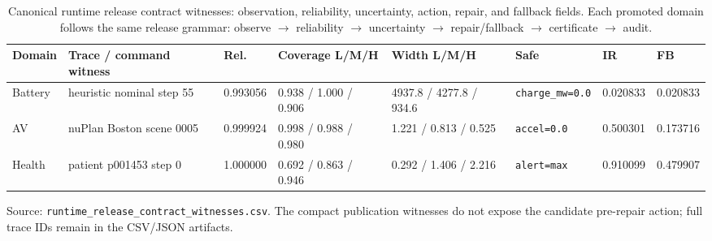 \begin{table}[t]
\centering
\caption{Canonical runtime release contract witnesses: observation, reliability,
uncertainty, action, repair, and fallback fields.  Each promoted domain follows
the same release grammar: observe $\rightarrow$ reliability $\rightarrow$ uncertainty
$\rightarrow$ repair/fallback $\rightarrow$ certificate $\rightarrow$ audit.}
\label{tab:runtime-release-contract-witnesses}
\scriptsize
\renewcommand{\arraystretch}{1.12}
\setlength{\tabcolsep}{3pt}
\begin{tabular}{@{}p{} p{} p{} p{} p{} p{} p{} p{}@{}}
\toprule
\textbf{Domain} & \textbf{Trace / command witness} & \textbf{Rel.} &
\textbf{Coverage L/M/H} & \textbf{Width L/M/H} & \textbf{Safe} &
\textbf{IR} & \textbf{FB}\\
\midrule
Battery & heuristic nominal step 55 & 0.993056 &
0.938 / 1.000 / 0.906 & 4937.8 / 4277.8 / 934.6 &
\texttt{charge\_mw=0.0} &
0.020833 & 0.020833\\
AV & nuPlan Boston scene 0005 & 0.999924 &
0.998 / 0.988 / 0.980 & 1.221 / 0.813 / 0.525 &
\texttt{accel=0.0} &
0.500301 & 0.173716\\
Health & patient p001453 step 0 & 1.000000 &
0.692 / 0.863 / 0.946 & 0.292 / 1.406 / 2.216 &
\texttt{alert=max} &
0.910099 & 0.479907\\
\bottomrule
\end{tabular}
\par\smallskip
\scriptsize Source: \texttt{runtime\_release\_contract\_witnesses.csv}.  The compact
publication witnesses do not expose the candidate pre-repair action; full trace IDs
remain in the CSV/JSON artifacts.
\end{table}


